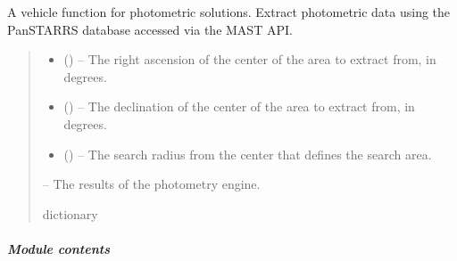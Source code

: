 \documentclass[letterpaper,11pt,english]{sphinxmanual}
\begin{document}
\begin{savenotes}\begin{fulllineitems}
\label{\detokenize{code/opihiexarata.photometry.solution:opihiexarata.photometry.solution._vehicle_panstarrs_mast_web_api}}
\pysigstartsignatures
{}
\pysigstopsignatures
\sphinxAtStartPar
A vehicle function for photometric solutions. Extract photometric
data using the PanSTARRS database accessed via the MAST API.
\begin{quote}\begin{description}
\begin{itemize}
\item {} 
\sphinxAtStartPar
{} () – The right ascension of the center of the area to extract from,
in degrees.

\item {} 
\sphinxAtStartPar
{} () – The declination of the center of the area to extract from,
in degrees.

\item {} 
\sphinxAtStartPar
{} () – The search radius from the center that defines the search area.

\end{itemize}

\sphinxAtStartPar
{} – The results of the photometry engine.

\sphinxAtStartPar
dictionary

\end{description}\end{quote}

\end{fulllineitems}\end{savenotes}



\subparagraph{Module contents}
\label{\detokenize{code/opihiexarata.photometry:module-opihiexarata.photometry}}\label{\detokenize{code/opihiexarata.photometry:module-contents}}
\sphinxstepscope
\end{document}
